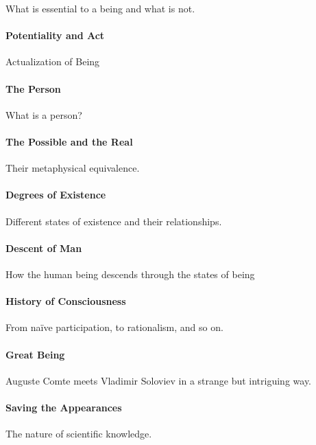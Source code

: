 What is essential to a being and what is not.

\paragraph{Potentiality and Act}


Actualization of Being

\paragraph{The Person}


What is a person?

\paragraph{The Possible and the Real}


Their metaphysical equivalence.

\paragraph{Degrees of Existence}


Different states of existence and their relationships.

\paragraph{Descent of Man}


How the human being descends through the states of being

\paragraph{History of Consciousness}


From naïve participation, to rationalism, and so on.

\paragraph{Great Being}


Auguste Comte meets Vladimir Soloviev in a strange but intriguing way.

\paragraph{Saving the Appearances}


The nature of scientific knowledge.

